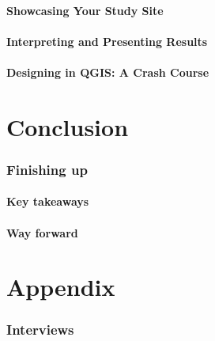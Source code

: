 \documentclass[
]{latex/krantz}
\begin{document}
\hypertarget{showcasing-your-study-site}{%
\subsection{Showcasing Your Study Site}\label{showcasing-your-study-site}}

\hypertarget{interpreting-and-presenting-results}{%
\subsection{Interpreting and Presenting Results}\label{interpreting-and-presenting-results}}

\hypertarget{designing-in-qgis-a-crash-course}{%
\subsection{Designing in QGIS: A Crash Course}\label{designing-in-qgis-a-crash-course}}

\hypertarget{part-conclusion}{%
\part{Conclusion}\label{part-conclusion}}

\hypertarget{finishing-up}{%
\section{Finishing up}\label{finishing-up}}

\hypertarget{key-takeaways}{%
\subsection{Key takeaways}\label{key-takeaways}}

\hypertarget{way-forward}{%
\subsection{Way forward}\label{way-forward}}

\hypertarget{part-appendix}{%
\part{Appendix}\label{part-appendix}}

\hypertarget{interviews}{%
\section{Interviews}\label{interviews}}
\end{document}
